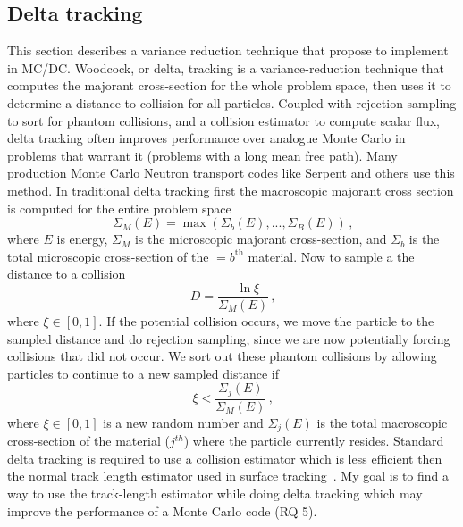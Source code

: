 %

\subsection{Delta tracking}

This section describes a variance reduction technique that propose to implement in MC/DC.
Woodcock, or delta, tracking \cite{woodcock_techniques_1965} is a variance-reduction technique that computes the majorant cross-section for the whole problem space, then uses it to determine a distance to collision for all particles.
Coupled with rejection sampling to sort for phantom collisions, and a collision estimator to compute scalar flux, delta tracking often improves performance over analogue Monte Carlo in problems that warrant it (problems with a long mean free path).
Many production Monte Carlo Neutron transport codes like Serpent \cite{leppanen_development_2013, leppanen_use_2017, leppanen_2010_burnup} and others \cite{delta2017rowland} use this method.
In traditional delta tracking first the macroscopic majorant cross section is computed for the entire problem space
\begin{equation}
    \label{eq:majorant}
    \Sigma_{M}(E) = \max\left(\Sigma_{b}(E), ..., \Sigma_{B}(E)\right) \,\text{,}
\end{equation}
where $E$ is energy, $\Sigma_{M}$ is the microscopic majorant cross-section, and $\Sigma_{b}$ is the total microscopic cross-section of the $=b^{\text{th}}$ material.
Now to sample a the distance to a collision
\begin{equation}
    \label{eq:sample}
    D = \frac{-\ln{\xi}}{\Sigma_{M}(E)} \, \text{,} 
\end{equation}
where $\xi\in[0,1]$.
If the potential collision occurs, we move the particle to the sampled distance and do rejection sampling, since we are now potentially forcing collisions that did not occur.
We sort out these phantom collisions by allowing particles to continue to a new sampled distance if
\begin{equation}
    \label{eq:reject}
    \xi < \frac{ \Sigma_{j}(E) } { \Sigma_M(E) } \, \text{,}
\end{equation}
where $\xi\in[0,1]$ is a new random number and $\Sigma_{j}(E)$ is the total macroscopic cross-section of the material ($j^{th}$) where the particle currently resides.
Standard delta tracking is required to use a collision estimator which is less efficient then the normal track length estimator used in surface tracking~\cite{mc2018}.
My goal is to find a way to use the track-length estimator while doing delta tracking which may improve the performance of a Monte Carlo code (RQ 5).







